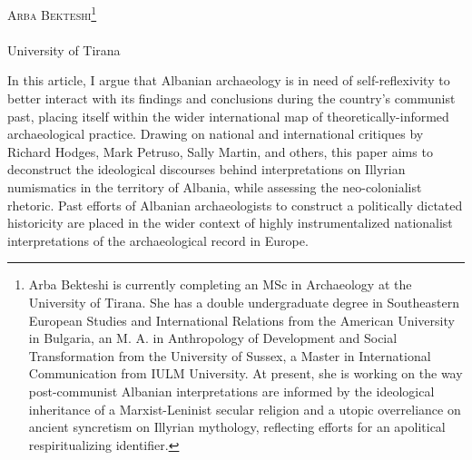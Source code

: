 \openingarticle
\def\ppages{\pagerange{bekteshi:firstpage}{bekteshi:lastpage}}
\def\shorttitle{Albanian Archaeology during Communism}
\def\maintitle{Albanian Archaeology during Communism: Constructing the Illyrian Myth through Numismatics}
\def\shortauthor{Arba Bekteshi}
\def\authormail{arba.bekteshi@gmail.com}
\def\affiliation{University of Tirana}
\def\thanknote{\footnote{Arba Bekteshi is currently completing an MSc in Archaeology at the University of Tirana. She has a double undergraduate degree in Southeastern European Studies and International Relations from the American University in Bulgaria, an M. A. in Anthropology of Development and Social Transformation from the University of Sussex, a Master in International Communication from IULM University. At present, she is working on the way post-communist Albanian interpretations are informed by the ideological inheritance of a Marxist-Leninist secular religion and a utopic overreliance on ancient syncretism on Illyrian mythology, reflecting efforts for an apolitical respiritualizing identifier.}}
\begin{center}
	{\Large\scshape\shortauthor \thanknote}\\[1em]
	\email \\
	\affiliation
\end{center}
\vspace{3em}
\midarticle
\label{bekteshi:firstpage}
%

	\begin{myabstract}  
		In this article, I argue that Albanian archaeology is in need of self-reflexivity to better interact with its findings and conclusions during the country's communist past, placing itself within the wider international map of theoretically-informed archaeological practice. Drawing on national and international critiques by Richard Hodges, Mark Petruso, Sally Martin, and others, this paper aims to deconstruct the ideological discourses behind interpretations on Illyrian numismatics in the territory of Albania, while assessing the neo-colonialist rhetoric. Past efforts of Albanian archaeologists to construct a politically dictated historicity are placed in the wider context of highly instrumentalized nationalist interpretations of the archaeological record in Europe. 
		
	\end{myabstract}
	


